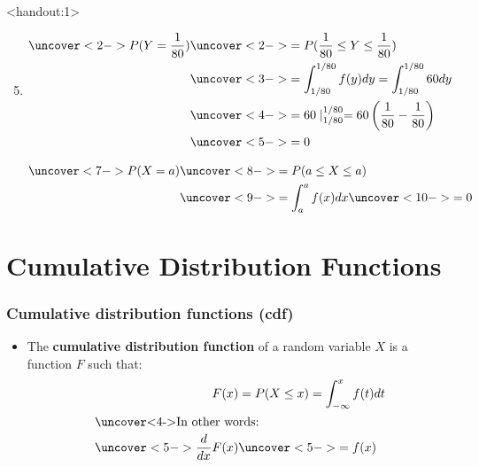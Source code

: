 \documentclass[handout]{beamer}\usepackage[]{graphicx}\usepackage[]{color}
\newcommand{\answers}{1}
\providecommand{\rt}{\rightarrow}
\numberwithin{equation}{section}
\begin{document}
\begin{frame}<handout:\answers>

\begin{enumerate}[1. ]
\setcounter{enumi}{4}
\item 

\begin{align*}
\uncover<2->{ P(Y = \frac{1}{80})} &\uncover<2->{ = P(\frac{1}{80} \le Y \le \frac{1}{80})} \\
&\uncover<3->{ = \int_{1/80}^{1/80} f(y) dy = \int_{1/80}^{1/80} 60 dy} \\
&\uncover<4->{ = 60 \mid_{1/80}^{1/80} = 60 \left ( \frac{1}{80} - \frac{1}{80} \right )} \\
&\uncover<5->{  = 0}
\end{align*}

\begin{align*}
\uncover<7->{ P(X = a)} &\uncover<8->{ = P(a \le X \le a)} \\
&\uncover<9->{ = \int_a^a f(x) dx} \uncover<10->{  = 0}
\end{align*}
\end{enumerate}
\end{frame}


















\section{Cumulative Distribution Functions}


\begin{frame}
\frametitle{Cumulative distribution functions (cdf)}
\begin{itemize}
\pause \item The {\bf cumulative distribution function} of a random variable $X$ is a function $F$ such that:
\pause \begin{align*}
F(x) &= P(X \le x) = \int_{-\infty}^x f(t) dt\\
 \intertext{\uncover<4->{In other words:}}
\uncover<5->{ \frac{d}{dx}F(x)} &\uncover<5->{= f(x)}
\end{align*}
\begin{itemize}
\uncover<9->{ \item $\lim_{x \rt -\infty} F(x)$ = 0}
\uncover<10->{ \item $\lim_{x \rt \infty} F(x)$ = 1}
\end{itemize}
\end{itemize}
\end{frame}
\end{document}

